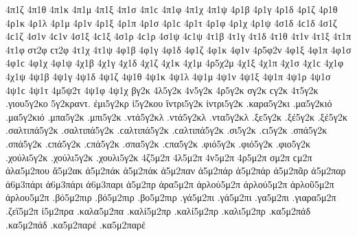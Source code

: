 {4π1ζ 
4π1θ 
4π1κ 
4π1μ 
4π1ξ 
4π1σ 4π1ϲ 
4π1φ 
4π1χ 
4π1ψ 
4ρ1β 
4ρ1γ 
4ρ1δ 
4ρ1ζ 
4ρ1θ 
4ρ1κ 
4ρ1λ 
4ρ1μ 
4ρ1ν 
4ρ1ξ 
4ρ1π 
4ρ1σ 4ρ1ϲ 
4ρ1τ 
4ρ1φ 
4ρ1χ 
4ρ1ψ 
4σ1δ 4ϲ1δ   %
4σ1ζ 4ϲ1ζ 
4σ1ν 4ϲ1ν   %
4σ1ξ 4ϲ1ξ 
4σ1ρ 4ϲ1ρ 
4σ1ψ 4ϲ1ψ 
4τ1β 
4τ1γ 
4τ1δ 
4τ1θ 
4τ1ν 
4τ1ξ 
4τ1π 
4τ1φ 
στ2φ ϲτ2φ   %
4τ1χ 
4τ1ψ 
4φ1β 
4φ1γ 
4φ1δ 
4φ1ζ 
4φ1κ   %
4φ1ν 
4ρ5φ2ν   %
4φ1ξ 
4φ1π 
4φ1σ 4φ1ϲ 
4φ1χ 
4φ1ψ 
4χ1β 
4χ1γ 
4χ1δ 
4χ1ζ 
4χ1κ 
4χ1μ 
4ρ5χ2μ   %
4χ1ξ 
4χ1π 
4χ1σ 4χ1ϲ 
4χ1φ 
4χ1ψ 
4ψ1β 
4ψ1γ 
4ψ1δ 
4ψ1ζ 
4ψ1θ 
4ψ1κ 
4ψ1λ 
4ψ1μ 
4ψ1ν 
4ψ1ξ 
4ψ1π 
4ψ1ρ 
4ψ1σ 4ψ1ϲ 
4ψ1τ 
4μ5ψ2τ   %
4ψ1φ 
4ψ1χ 
βγ2κ 
4λ5γ2κ 
4ν5γ2κ 
4ρ5γ2κ 
σγ2κ ϲγ2κ 
4τ5γ2κ 
.γιου5γ2κο   %
5γ2κραντ.   %
ἐμι5γ2κρ   %
ἰ5γ2κου   %
ἴντρι5γ2κ   %
ἰντρι5γ2κ 
.καρα5γ2κι   %
.μα5γ2κιό .μα5γ2κιό   %
.μπα5γ2κ   %
.μπι5γ2κ   %
.ντά5γ2κλ .ντά5γ2κλ   %
.ντα5γ2κλ   %
.ξε5γ2κ   %
.ξέ5γ2κ .ξέ5γ2κ 
.σαλτιπά5γ2κ .σαλτιπά5γ2κ .ϲαλτιπά5γ2κ .ϲαλτιπά5γ2κ   %
.σι5γ2κ .ϲι5γ2κ   %
.σπά5γ2κ .σπά5γ2κ .ϲπά5γ2κ .ϲπά5γ2κ   %
.σπα5γ2κ .ϲπα5γ2κ 
.φιό5γ2κ .φιό5γ2κ   %
.φιο5γ2κ 
.χούλι5γ2κ .χούλι5γ2κ   %
.χουλι5γ2κ 
4ζ5μ2π 
4λ5μ2π 
4ν5μ2π 
4ρ5μ2π 
σμ2π ϲμ2π 
ἀλα5μ2που   %
ἄ5μ2ακ   %
ἀ5μ2πάκ ἀ5μ2πάκ 
ἀ5μ2παν   %
ἀ5μ2πάρ ἀ5μ2πάρ   %
ἀ5μ2πᾶρ 
ἀ5μ2παρ 
ἀ6μ3πάρι ἀ6μ3πάρι   %
ἀ6μ3παρι 
ἀ5μ2πρ   %
ἀρα5μ2π   %
ἀρλού5μ2π ἀρλού5μ2π   %
ἀρλοῦ5μ2π 
ἀρλου5μ2π 
.βό5μ2πιρ .βό5μ2πιρ   %
.βο5μ2πιρ   %
.γά5μ2πι .γά5μ2πι   %
.γα5μ2πι 
.γιαρα5μ2π   %
.ζεϊ5μ2π   %
ἰ5μ2πρα   %
.καλα5μ2πα   %
.καλί5μ2πρ .καλί5μ2πρ   %
.καλι5μ2πρ 
.κα5μ2πάδ .κα5μ2πάδ   %
.κα5μ2παρέ .κα5μ2παρέ   %
}
